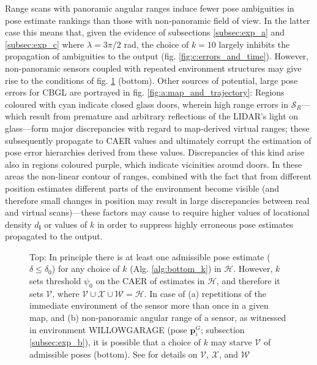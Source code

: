 Range scans with panoramic angular ranges induce fewer pose ambiguities in pose
estimate rankings than those with non-panoramic field of view. In the latter
case this means that, given the evidence of subsections \ref{subsec:exp_a} and
\ref{subsec:exp_c} where $\lambda = 3\pi/2$ rad, the choice of $k=10$ largely
inhibits the propagation of ambiguities to the output (fig.
\ref{fig:c:errors_and_time}).  However, non-panoramic sensors coupled with
repeated environment structures may give rise to the conditions of fig.
\ref{fig:h_and_h_not_fig} (bottom). Other sources of potential, large pose
errors for CBGL are portrayed in fig. \ref{fig:a:map_and_trajectory}:
Regions coloured with cyan indicate closed glass doors, wherein high range
errors in $\mathcal{S}_R$---which result from premature and arbitrary
reflections of the LIDAR's light on glass---form major discrepancies with
regard to map-derived virtual ranges; these subsequently propagate to CAER
values and ultimately corrupt the estimation of pose error hierarchies derived
from these values.  Discrepancies of this kind arise also in regions coloured
purple, which indicate vicinities around doors. In these areas the non-linear
contour of ranges, combined with the fact that from different position
estimates different parts of the environment become visible (and therefore
small changes in position may result in large discrepancies between real and
virtual scans)---these factors may cause to require higher values of locational
density $d_{\bm{l}}$ or values of $k$ in order to suppress highly erroneous
pose estimates propagated to the output.

\begin{figure}
  
  \vspace{0.3cm}
  \caption{\small Top: In principle there is at least one admissible pose
           estimate ($\delta \leq \delta_0$) for any choice of $k$ (Alg.
           \ref{alg:bottom_k}) in $\mathcal{H}$. However, $k$ sets threshold
           $\psi_0$ on the CAER of estimates in $\mathcal{H}$, and therefore it
           sets $\mathcal{V}$, where $\mathcal{V} \cup \mathcal{X} \cup
           \mathcal{W} = \mathcal{H}$. In case of (a) repetitions of the
           immediate environment of the sensor more than once in a given map,
           and (b) non-panoramic angular range of a sensor, as witnessed in
           environment WILLOWGARAGE (pose $\bm{p}_{i}^G$; subsection
           \ref{subsec:exp_b}), it is possible that a choice of $k$ may starve
           $\mathcal{V}$ of admissible poses (bottom). See \cite{cbglarxiv} for
           details on $\mathcal{V}$, $\mathcal{X}$, and $\mathcal{W}$
        }
        \vspace{-0.5cm}
  \label{fig:h_and_h_not_fig}
\end{figure}
